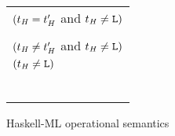 
\newcommand{\oshmmheq}
{
\redruleh
{\exphm{\first{\vartyh}}{\tylump}{(\expmh{\tylump}{\second{\vartyh}}{\varexph})}}
{\varexph}
$(\first{\vartyh} = \second{\vartyh}$ and $\first{\vartyh} \neq \tylump)$
}


\newcommand{\oshmmhneq}
{
\redruleh
{\exphm{\first{\vartyh}}{\tylump}{(\expmh{\tylump}{\second{\vartyh}}{\varexph})}}
{\expwrongs{\vartyh}{\errtype}} \\

\redsp $(\first{\vartyh} \neq \second{\vartyh}$ and $\first{\vartyh} \neq \tylump)$
}


\newcommand{\oshmms}
{
\redruleh
{\exphm{\vartyh}{\tylump}{(\expms{\cslump}{\varvalfs})}}
{\expwrongs{\vartyh}{\errvalue}}
$(\vartyh \neq \tylump)$
}


\newcommand{\oshmnum}
{
\redruleh
{\exphm{\tynum}{\tynum}{\expnum{\varnum}}}
{\expnum{\varnum}}
}


\newcommand{\oshmnil}
{
\redruleh
{\exphm{\tylist{\vartyh}}{\tylist{\first{\vartym}}}{(\expnils{\second{\vartym}})}}
{\expnils{\vartyh}}
}


\newcommand{\oshmcons}
{
\redruleh
{\exphm{\tylist{\vartyh}}{\tylist{\vartym}}{(\expcons{\first{\varvalum}}{\second{\varvalum}})}}
{\expcons{(\exphm{\vartyh}{\vartym}{\first{\varvalum}})}{(\exphm{\tylist{\vartyh}}{\tylist{\vartym}}{\second{\varvalum}})}}
}


\newcommand{\oshmfabs}
{
\redrule
{\redconh{\exphm{(\tyfun{\first{\vartyh}}{\second{\vartyh}})}{(\tyfun{\first{\vartym}}{\second{\vartym}})}{(\expfabss{\varvarm}{\third{\vartym}}{\varexpm})}}}
{} \\

\redsp \redcon{\expfabss{\varvarh}{\first{\vartyh}}{\exphm{\second{\vartyh}}{\second{\vartym}}{\expfapp{((\expfabss{\varvarm}{\third{\vartym}}{\varexpm})}{(\expmh{\first{\vartym}}{\first{\vartyh}}{\varvarh})})}}}
}


\newcommand{\oshmtabs}
{
\redruleh
{\exphm{(\tyfor{\tyvarh}{\vartyh})}{(\tyfor{\first{\tyvarm}}{\vartym})}{(\exptabs{\second{\tyvarm}}{\varexpm})}}
{\exptabs{\tyvarh}{\exphm{\vartyh}{\tysubst{\vartym}{\tylump}{\tyvarm}}{\expsubst{\varexpm}{\tylump}{\second{\tyvarm}}}}}
}

\begin{figure}[p]
\centering
\begin{tabular}{l}

\oshmmheq \\
\oshmmhneq \\
\oshmms \\
\oshmnum \\
\oshmnil \\
\oshmcons \\
\oshmfabs \\
\oshmtabs \\

\end{tabular}
\caption{Haskell-ML operational semantics}
\label{hmos}
\end{figure}
